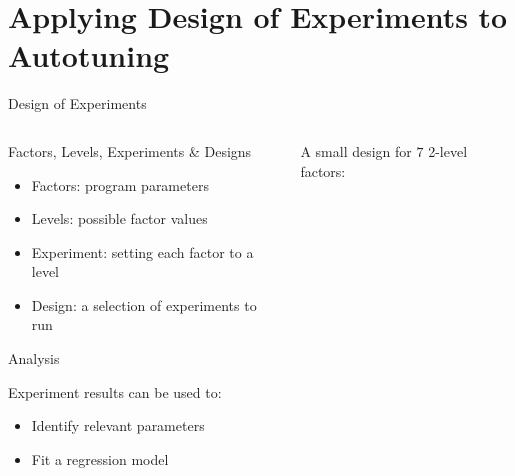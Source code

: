 \documentclass[10pt, compress, aspectratio=169, xcolor={table,usenames,dvipsnames}]{beamer}
\begin{document}
\section{Applying Design of Experiments to Autotuning}
\label{sec:orge799718}
\begin{frame}[label={sec:org82559af}]{Design of Experiments}
\begin{columns}
\begin{column}{0.5\columnwidth}
\begin{block}{Factors, Levels, Experiments \& Designs}
\vspace{.2cm}

\begin{itemize}
\item \alert{Factors}: program \alert{parameters}
\item \alert{Levels}: possible factor \alert{values}
\item \alert{Experiment}: setting each factor to a level
\item \alert{Design}: a \alert{selection} of experiments to \alert{run}
\end{itemize}

\begin{block}{Analysis}
\vspace{.2cm}

\alert{Experiment results} can be used to:

\begin{itemize}
\item Identify \alert{relevant parameters}
\item Fit a \alert{regression model}
\end{itemize}
\end{block}
\end{block}
\end{column}

\begin{column}{0.5\columnwidth}
\vspace{.4cm}

A \alert{small design} for \(7\) \alert{2-level factors}:

\vspace{.2cm}


\end{column}
\end{columns}
\end{frame}
\end{document}
